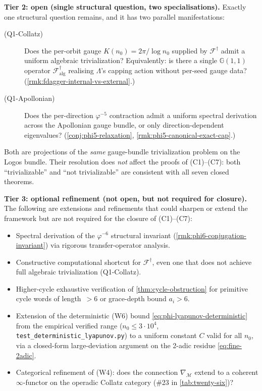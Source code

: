 \documentclass[11pt,a4paper]{article}
\theoremstyle{plain}
\theoremstyle{definition}
\theoremstyle{remark}
\numberwithin{equation}{section}
\newcommand{\Cl}{\mathbb{G}}
\newcommand{\vp}{\varphi}
\begin{document}
\medskip\noindent\textbf{Tier 2: open (single structural
question, two specialisations).}  Exactly one structural
question remains, and it has two parallel manifestations:
\begin{description}
  \item[\textup{(Q1-Collatz)}] Does the per-orbit gauge
        $K(n_0)=2\pi/\log n_0$ supplied by
        $\mathcal{F}^{\dagger}$ admit a uniform algebraic
        trivialization?  Equivalently: is there a single
        $\Cl(1,1)$ operator $\mathcal{F}^{\dagger}_{\mathrm{alg}}$
        realising $\Lambda$'s capping action without
        per-seed gauge data?
        (\cref{rmk:fdagger-internal-vs-external}.)
  \item[\textup{(Q1-Apollonian)}] Does the per-direction
        $\vp^{-5}$ contraction admit a uniform spectral
        derivation across the Apollonian gauge bundle, or
        only direction-dependent eigenvalues?
        (\cref{conj:phi5-relaxation},
        \cref{rmk:phi5-canonical-exact-cap}.)
\end{description}
Both are projections of the \emph{same} gauge-bundle
trivialization problem on the Logos bundle.  Their resolution
does \emph{not} affect the proofs of (C1)--(C7): both
``trivializable'' and ``not trivializable'' are consistent
with all seven closed theorems.

\medskip\noindent\textbf{Tier 3: optional refinement (not
open, but not required for closure).}  The following are
extensions and refinements that could sharpen or extend the
framework but are not required for the closure of (C1)--(C7):
\begin{itemize}
  \item Spectral derivation of the $\vp^{-6}$ structural
        invariant (\cref{rmk:phi6-conjugation-invariant}) via
        rigorous transfer-operator analysis.
  \item Constructive computational shortcut for
        $\mathcal{F}^{\dagger}$, even one that does not
        achieve full algebraic trivialization (Q1-Collatz).
  \item Higher-cycle exhaustive verification of
        \cref{thm:cycle-obstruction} for primitive cycle
        words of length~$> 6$ or grace-depth bound $a_i> 6$.
  \item Extension of the deterministic (W6) bound
        \eqref{eq:phi-lyapunov-deterministic} from the empirical
        verified range ($n_0\le 3\cdot 10^4$,
        \texttt{test\_deterministic\_lyapunov.py}) to a uniform
        constant $C$ valid for all $n_0$, via a closed-form
        large-deviation argument on the 2-adic residue
        \eqref{eq:fine-2adic}.
  \item Categorical refinement of (W4): does the connection
        $\nabla_{\mathcal{M}}$ extend to a coherent
        $\infty$-functor on the operadic Collatz category
        (\#23 in \cref{tab:twenty-six})?
\end{itemize}
\end{document}
